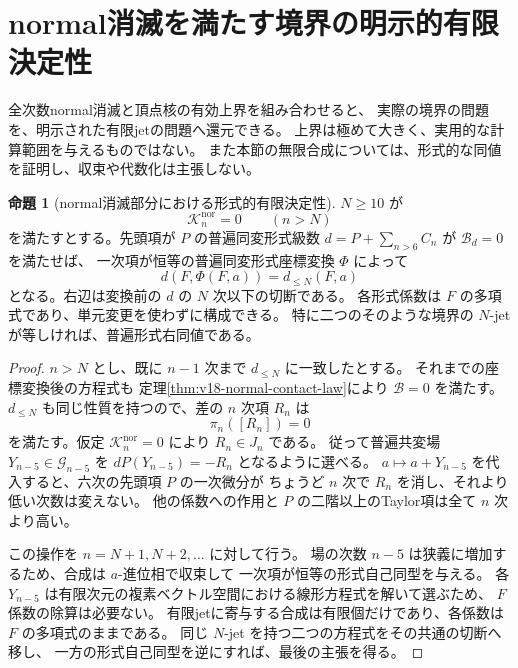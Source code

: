 \documentclass[a4paper,11pt]{ltjsarticle}
\theoremstyle{definition}
\newtheorem{theorem}{命題}[section]
\begin{document}


\section{normal消滅を満たす境界の明示的有限決定性}
\label{sec:v18-finite-determinacy}

全次数normal消滅と頂点核の有効上界を組み合わせると、
実際の境界の問題を、明示された有限jetの問題へ還元できる。
上界は極めて大きく、実用的な計算範囲を与えるものではない。
また本節の無限合成については、形式的な同値を証明し、収束や代数化は主張しない。

\begin{theorem}[normal消滅部分における形式的有限決定性]
\label{thm:v18-relative-finite-determinacy}
$N\ge10$ が
\[
 \mathcal K_n^{\mathrm{nor}}=0\qquad(n>N)
\]
を満たすとする。先頭項が $P$ の普遍同変形式級数
$d=P+\sum_{n>6}C_n$ が $\mathcal B_d=0$ を満たせば、
一次項が恒等の普遍同変形式座標変換 $\Phi$ によって
\begin{equation}\label{eq:v18-formal-finite-truncation}
 d(F,\Phi(F,a))=d_{\le N}(F,a)
\end{equation}
となる。右辺は変換前の $d$ の $N$ 次以下の切断である。
各形式係数は $F$ の多項式であり、単元変更を使わずに構成できる。
特に二つのそのような境界の $N$-jet が等しければ、普遍形式右同値である。
\end{theorem}

\begin{proof}
$n>N$ とし、既に $n-1$ 次まで $d_{\le N}$ に一致したとする。
それまでの座標変換後の方程式も
定理\ref{thm:v18-normal-contact-law}により $\mathcal B=0$ を満たす。
$d_{\le N}$ も同じ性質を持つので、差の $n$ 次項 $R_n$ は
\[
 \pi_n([R_n])=0
\]
を満たす。仮定 $\mathcal K_n^{\mathrm{nor}}=0$ により $R_n\in J_n$ である。
従って普遍共変場 $Y_{n-5}\in\mathcal G_{n-5}$ を
$dP(Y_{n-5})=-R_n$ となるように選べる。
$a\mapsto a+Y_{n-5}$ を代入すると、六次の先頭項 $P$ の一次微分が
ちょうど $n$ 次で $R_n$ を消し、それより低い次数は変えない。
他の係数への作用と $P$ の二階以上のTaylor項は全て $n$ 次より高い。

この操作を $n=N+1,N+2,\ldots$ に対して行う。
場の次数 $n-5$ は狭義に増加するため、合成は $a$-進位相で収束して
一次項が恒等の形式自己同型を与える。
各 $Y_{n-5}$ は有限次元の複素ベクトル空間における線形方程式を解いて選ぶため、
$F$ 係数の除算は必要ない。
有限jetに寄与する合成は有限個だけであり、各係数は $F$ の多項式のままである。
同じ $N$-jet を持つ二つの方程式をその共通の切断へ移し、
一方の形式自己同型を逆にすれば、最後の主張を得る。
\end{proof}
\end{document}
